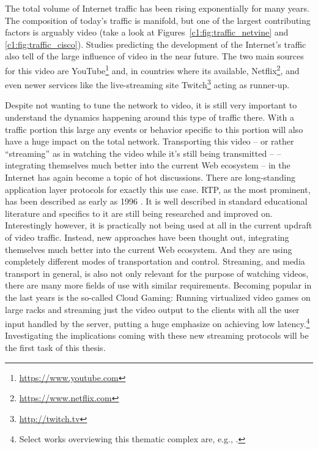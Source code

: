 The total volume of Internet traffic has been rising exponentially for many years. The composition of today's traffic is manifold, but one of the largest contributing factors is arguably video (take a look at Figures~\ref{c1:fig:traffic_netvine} and \ref{c1:fig:traffic_cisco}). Studies predicting the development of the Internet's traffic also tell of the large influence of video in the near future. The two main sources for this video are YouTube\footnote{\url{https://www.youtube.com}} and, in countries where its available, Netflix\footnote{\url{https://www.netflix.com}}, and even newer services like the live-streaming site Twitch\footnote{\url{http://twitch.tv}} acting as runner-up.

Despite not wanting to tune the network to video, it is still very important to understand the dynamics happening around this type of traffic there. With a traffic portion this large any events or behavior specific to this portion will also have a huge impact on the total network.
Transporting this video -- or rather ``streaming'' as in watching the video while it's still being transmitted -- -- integrating themselves much better into the current Web ecosystem --  in the Internet has again become a topic of hot discussions. There are long-standing application layer protocols for exactly this use case. \gls{RTP}, as the most prominent, has been described as early as 1996 \cite{rfc1889}. It is well described in standard educational literature and specifics to it are still being researched and improved on. Interestingly however, it is practically not being used at all in the current updraft of video traffic. 
Instead, new approaches have been thought out, integrating themselves much better into the current Web ecosystem.
And they are using completely different modes of transportation and control. Streaming, and media transport in general, is also not only relevant for the purpose of watching videos, there are many more fields of use with similar requirements. Becoming popular in the last years is the so-called Cloud Gaming: Running virtualized video games on large racks and streaming just the video output to the clients with all the user input handled by the server, putting a huge emphasize on achieving low latency.\footnote{Select works overviewing this thematic complex are, e.g., \cite{4795441,wang2009modeling,jarschel2011cloudevaluation,ct2010wolken}.}
Investigating the implications coming with these new streaming protocols will be the first task of this thesis.

